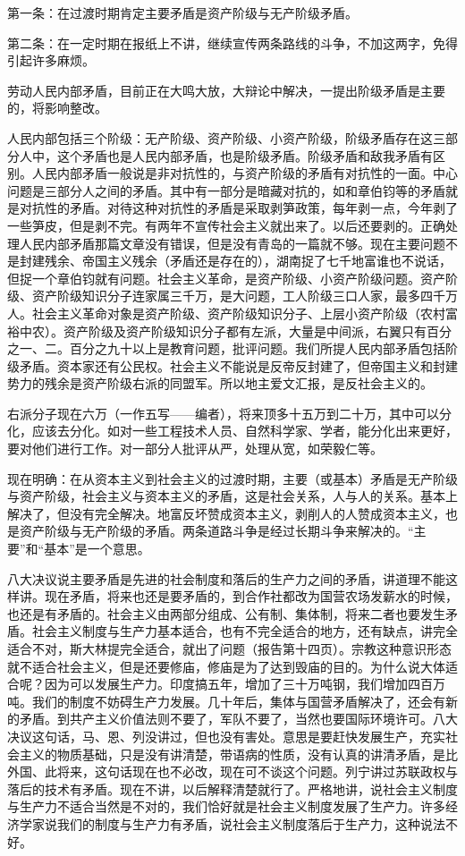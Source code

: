 第一条：在过渡时期肯定主要矛盾是资产阶级与无产阶级矛盾。

第二条：在一定时期在报纸上不讲，继续宣传两条路线的斗争，不加这两字，免得引起许多麻烦。

劳动人民内部矛盾，目前正在大鸣大放，大辩论中解决，一提出阶级矛盾是主要的，将影响整改。

人民内部包括三个阶级：无产阶级、资产阶级、小资产阶级，阶级矛盾存在这三部分人中，这个矛盾也是人民内部矛盾，也是阶级矛盾。阶级矛盾和敌我矛盾有区别。人民内部矛盾一般说是非对抗性的，与资产阶级的矛盾有对抗性的一面。中心问题是三部分人之间的矛盾。其中有一部分是暗藏对抗的，如和章伯钧等的矛盾就是对抗性的矛盾。对待这种对抗性的矛盾是采取剥笋政策，每年剥一点，今年剥了一些笋皮，但是剥不完。有两年不宣传社会主义就出来了。以后还要剥的。正确处理人民内部矛盾那篇文章没有错误，但是没有青岛的一篇就不够。现在主要问题不是封建残余、帝国主义残余（矛盾还是存在的），湖南捉了七千地富谁也不说话，但捉一个章伯钧就有问题。社会主义革命，是资产阶级、小资产阶级问题。资产阶级、资产阶级知识分子连家属三千万，是大问题，工人阶级三口人家，最多四千万人。社会主义革命对象是资产阶级、资产阶级知识分子、上层小资产阶级（农村富裕中农）。资产阶级及资产阶级知识分子都有左派，大量是中间派，右翼只有百分之一、二。百分之九十以上是教育问题，批评问题。我们所提人民内部矛盾包括阶级矛盾。资本家还有公民权。社会主义不能说是反帝反封建了，但帝国主义和封建势力的残余是资产阶级右派的同盟军。所以地主爱文汇报，是反社会主义的。

右派分子现在六万（一作五写——编者），将来顶多十五万到二十万，其中可以分化，应该去分化。如对一些工程技术人员、自然科学家、学者，能分化出来更好，要对他们进行工作。对一部分人批评从严，处理从宽，如荣毅仁等。

现在明确：在从资本主义到社会主义的过渡时期，主要（或基本）矛盾是无产阶级与资产阶级，社会主义与资本主义的矛盾，这是社会关系，人与人的关系。基本上解决了，但没有完全解决。地富反坏赞成资本主义，剥削人的人赞成资本主义，也是资产阶级与无产阶级的矛盾。两条道路斗争是经过长期斗争来解决的。“主要”和“基本”是一个意思。

八大决议说主要矛盾是先进的社会制度和落后的生产力之间的矛盾，讲道理不能这样讲。现在矛盾，将来也还是要矛盾的，到合作社都改为国营农场发薪水的时候，也还是有矛盾的。社会主义由两部分组成、公有制、集体制，将来二者也要发生矛盾。社会主义制度与生产力基本适合，也有不完全适合的地方，还有缺点，讲完全适合不对，斯大林提完全适合，就出了问题（报告第十四页）。宗教这种意识形态就不适合社会主义，但是还要修庙，修庙是为了达到毁庙的目的。为什么说大体适合呢？因为可以发展生产力。印度搞五年，增加了三十万吨钢，我们增加四百万吨。我们的制度不妨碍生产力发展。几十年后，集体与国营矛盾解决了，还会有新的矛盾。到共产主义价值法则不要了，军队不要了，当然也要国际环境许可。八大决议这句话，马、恩、列没讲过，但也没有害处。意思是要赶快发展生产，充实社会主义的物质基础，只是没有讲清楚，带语病的性质，没有认真的讲清矛盾，是比外国、此将来，这句话现在也不必改，现在可不谈这个问题。列宁讲过苏联政权与落后的技术有矛盾。现在不讲，以后解释清楚就行了。严格地讲，说社会主义制度与生产力不适合当然是不对的，我们恰好就是社会主义制度发展了生产力。许多经济学家说我们的制度与生产力有矛盾，说社会主义制度落后于生产力，这种说法不好。

